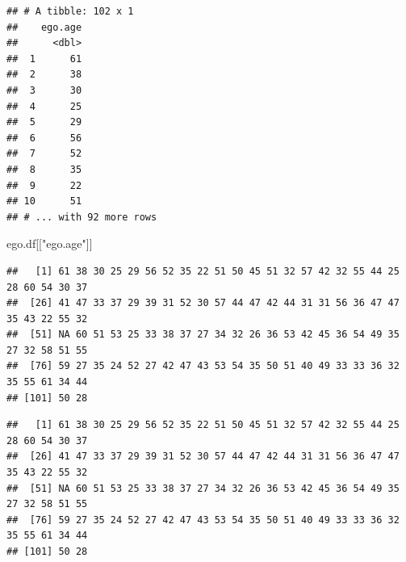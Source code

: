 \documentclass[
]{book}
\newenvironment{Shaded}{\begin{snugshade}}{\end{snugshade}}
\newcommand{\CommentTok}[1]{\textcolor[rgb]{0.56,0.35,0.01}{\textit{#1}}}
\newcommand{\DecValTok}[1]{\textcolor[rgb]{0.00,0.00,0.81}{#1}}
\newcommand{\FunctionTok}[1]{\textcolor[rgb]{0.00,0.00,0.00}{#1}}
\newcommand{\NormalTok}[1]{#1}
\newcommand{\SpecialCharTok}[1]{\textcolor[rgb]{0.00,0.00,0.00}{#1}}
\newcommand{\StringTok}[1]{\textcolor[rgb]{0.31,0.60,0.02}{#1}}
\begin{document}
\begin{verbatim}
## # A tibble: 102 x 1
##    ego.age
##      <dbl>
##  1      61
##  2      38
##  3      30
##  4      25
##  5      29
##  6      56
##  7      52
##  8      35
##  9      22
## 10      51
## # ... with 92 more rows
\end{verbatim}

\begin{Shaded}
\begin{Highlighting}[]
\NormalTok{ego.df[[}\StringTok{"ego.age"}\NormalTok{]]}
\end{Highlighting}
\end{Shaded}

\begin{verbatim}
##   [1] 61 38 30 25 29 56 52 35 22 51 50 45 51 32 57 42 32 55 44 25 28 60 54 30 37
##  [26] 41 47 33 37 29 39 31 52 30 57 44 47 42 44 31 31 56 36 47 47 35 43 22 55 32
##  [51] NA 60 51 53 25 33 38 37 27 34 32 26 36 53 42 45 36 54 49 35 27 32 58 51 55
##  [76] 59 27 35 24 52 27 42 47 43 53 54 35 50 51 40 49 33 33 36 32 35 55 61 34 44
## [101] 50 28
\end{verbatim}

\begin{Shaded}
\begin{Highlighting}[]
\CommentTok{\# The $ notation is very common and concise. It\textquotesingle{}s equivalent to the [[ notation.}
\NormalTok{ego.df}\SpecialCharTok{$}\NormalTok{ego.age}
\end{Highlighting}
\end{Shaded}

\begin{verbatim}
##   [1] 61 38 30 25 29 56 52 35 22 51 50 45 51 32 57 42 32 55 44 25 28 60 54 30 37
##  [26] 41 47 33 37 29 39 31 52 30 57 44 47 42 44 31 31 56 36 47 47 35 43 22 55 32
##  [51] NA 60 51 53 25 33 38 37 27 34 32 26 36 53 42 45 36 54 49 35 27 32 58 51 55
##  [76] 59 27 35 24 52 27 42 47 43 53 54 35 50 51 40 49 33 33 36 32 35 55 61 34 44
## [101] 50 28
\end{verbatim}

\begin{Shaded}
\end{Shaded}
\end{document}
